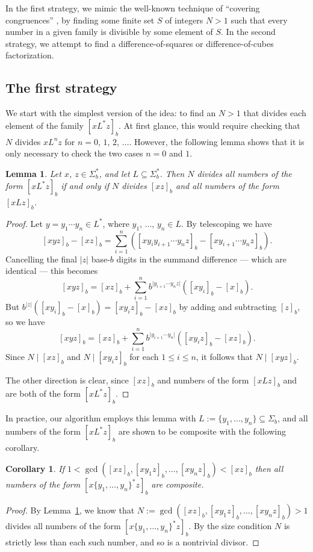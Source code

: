 \documentclass[12pt]{article}
\theoremstyle{plain}
\newtheorem{corollary}[theorem]{Corollary}
\newtheorem{lemma}[theorem]{Lemma}
\theoremstyle{definition}
\theoremstyle{remark}
\newcommand{\0}{\mathtt{0}}
\newcommand{\1}{\mathtt{1}}
\newcommand{\2}{\mathtt{2}}
\newcommand{\3}{\mathtt{3}}
\newcommand{\4}{\mathtt{4}}
\newcommand{\5}{\mathtt{5}}
\newcommand{\6}{\mathtt{6}}
\newcommand{\7}{\mathtt{7}}
\newcommand{\8}{\mathtt{8}}
\newcommand{\9}{\mathtt{9}}
\begin{document}
In the first strategy, we mimic the well-known technique of ``covering
congruences'' \cite{Choi},
by finding some finite set $S$ of integers $N > 1$ such that
every number in a given family is divisible by some element of $S$.
In the second strategy, we attempt to find a
difference-of-squares or difference-of-cubes factorization.

\subsection{The first strategy}

We start with the simplest version of the idea:  to find 
an $N > 1$ that divides each element of the family $[xL^*z]_b$.
At first glance, this would require
checking that $N$ divides $xL^nz$ for $n=0$, $1$, $2$, $\dotsc$.
However, the following lemma shows that it is only necessary to check
the two cases $n=0$ and $1$.

\begin{lemma}\label{lemone}
Let $x$, $z\in \Sigma^*_b$, and let $L\subseteq\Sigma^*_b$.
Then 
$N$ divides all numbers of the form $[xL^*z]_b$
if and only if 
$N$ divides $[xz]_b$ and all numbers of the form $[xLz]_b$.
\end{lemma}
\begin{proof}%
Let $y=y_1\dotsm y_n\in L^*$, where $y_1$, $\dotsc$, $y_n\in L$.  
By telescoping we have
\[ [xyz]_b - [xz]_b = \sum_{i=1}^{n}([xy_{i}y_{i+1}\dotsm y_n z]_b-[xy_{i+1}\dotsm y_n z]_b) . \]
Cancelling the final $|z|$ base-$b$ digits in the summand difference ---
which are identical --- this becomes
\[ [xyz]_b = [xz]_b + \sum_{i=1}^{n}b^{\lvert{y_{i+1}\dotsm y_n z}\rvert}([xy_i]_b-[x]_b) . \]
But $b^{\lvert z\rvert}([xy_i]_b-[x]_b)=[xy_iz]_b-[xz]_b$ by 
adding and subtracting $[z]_b$, so we have
\[ [xyz]_b = [xz]_b + \sum_{i=1}^{n}b^{\vert{y_{i+1}\dotsm y_n}\rvert}([xy_iz]_b-[xz]_b) . \]
Since $N\mid[xz]_b$ and $N\mid[xy_iz]_b$ for each $1\leq i\leq n$,
 it follows that $N\mid[xyz]_b$.
 
The other direction is clear, since $[xz]_b$ and numbers of the 
form $[xLz]_b$ and are both of the form $[xL^*z]_b$.
\end{proof}

In practice, our algorithm employs this lemma with 
$L:=\{y_1,\dotsc,y_n\}\subseteq\Sigma_b$, and all numbers of the form
$[xL^*z]_b$ are shown to be composite with the following corollary.
\begin{corollary}\label{corone}
If $1<\gcd([xz]_b,[xy_1z]_b,\dotsc,[xy_nz]_b)<[xz]_b$
 then all numbers of the form $[x\{y_1,\dotsc,y_n\}^*z]_b$ are composite.
\end{corollary}
\begin{proof}
By Lemma~\ref{lemone}, we know
that $N:=\gcd([xz]_b,[xy_1z]_b,\dotsc,[xy_nz]_b)>1$ 
divides all numbers of the form $[x\{y_1,\dotsc,y_n\}^*z]_b$.
By the size condition $N$ is strictly less than each such number, and
so is a nontrivial divisor.
\end{proof}
\end{document}
